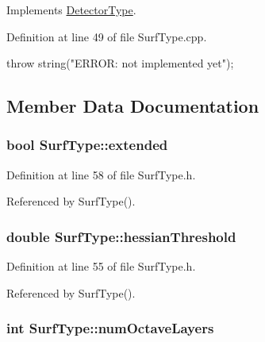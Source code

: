 \-Implements \hyperlink{class_detector_type_a1115eaed51cec6ea0d4183edba767da0}{\-Detector\-Type}.



\-Definition at line 49 of file \-Surf\-Type.\-cpp.


\begin{DoxyCode}
                             {
    throw string("ERROR: not implemented yet");
}
\end{DoxyCode}


\subsection{\-Member \-Data \-Documentation}
\hypertarget{class_surf_type_a5be0768cb22a3835aae95d3407e0cfb9}{
\subsubsection[{extended}]{\setlength{\rightskip}{0pt plus 5cm}bool {\bf \-Surf\-Type\-::extended}}}
\label{class_surf_type_a5be0768cb22a3835aae95d3407e0cfb9}


\-Definition at line 58 of file \-Surf\-Type.\-h.



\-Referenced by \-Surf\-Type().

\hypertarget{class_surf_type_afdda70856221656d1239c1a84e09180d}{
\subsubsection[{hessian\-Threshold}]{\setlength{\rightskip}{0pt plus 5cm}double {\bf \-Surf\-Type\-::hessian\-Threshold}}}
\label{class_surf_type_afdda70856221656d1239c1a84e09180d}


\-Definition at line 55 of file \-Surf\-Type.\-h.



\-Referenced by \-Surf\-Type().

\hypertarget{class_surf_type_ac77d9983a92804e59aacb156d7b95ac1}{
\subsubsection[{num\-Octave\-Layers}]{\setlength{\rightskip}{0pt plus 5cm}int {\bf \-Surf\-Type\-::num\-Octave\-Layers}}}
\label{class_surf_type_ac77d9983a92804e59aacb156d7b95ac1}


